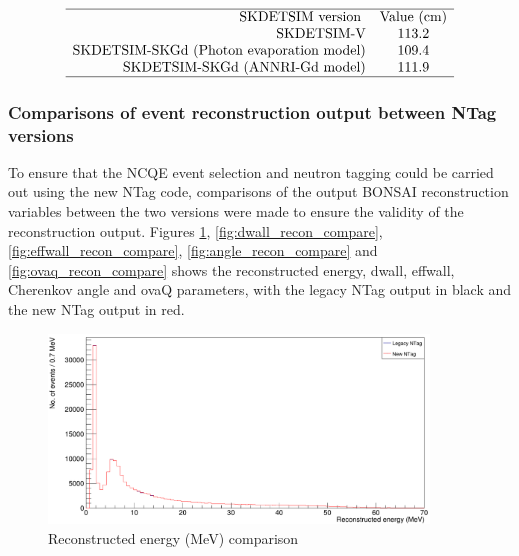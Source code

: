 \begin{table}
    $$
    \begin{array}{rcc}
    \hline \text { SKDETSIM version } & \text{Value (cm)} \\
    \text{SKDETSIM-V} & 113.2\\
    \text{SKDETSIM-SKGd (Photon evaporation model)} & 109.4 \\
    \text{SKDETSIM-SKGd (ANNRI-Gd model)} & 111.9 \\
    \hline
    \end{array}
    $$
\caption{Value of the true neutrino vertex - reconstructed neutrino vertex distribution which encompasses 1-sigma (68\%) of the number of events.}
\label{table:vertex_resolution}
\end{table}

\subsubsection{Comparisons of event reconstruction output between NTag versions}
To ensure that the NCQE event selection and neutron tagging could be carried out using the new NTag code, comparisons of the output BONSAI reconstruction variables between the two versions were made to ensure the validity of the reconstruction output. Figures \ref{fig:energy_recon_compare}, \ref{fig:dwall_recon_compare}, \ref{fig:effwall_recon_compare}, \ref{fig:angle_recon_compare} and \ref{fig:ovaq_recon_compare}  shows the reconstructed energy, dwall, effwall, Cherenkov angle and ovaQ parameters, with the legacy NTag output in black and the new NTag output in red. 


\begin{figure}
        \centering
        \includegraphics[width=0.9\textwidth]{Figures/energy_recon_compare.PNG}
        \caption{Reconstructed energy (MeV) comparison}
        \label{fig:energy_recon_compare}    
\end{figure}

